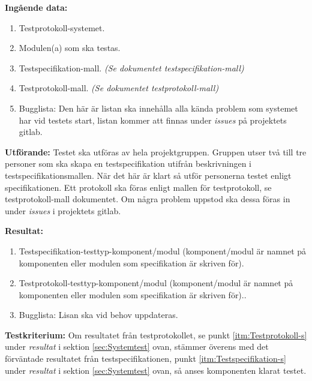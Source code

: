 \documentclass[a4paper,10pt]{article}
\begin{document}
\textbf{Ingående data:}
        \begin{enumerate}
            \item Testprotokoll-systemet.
            \item Modulen(a) som ska testas.
            \item Testspecifikation-mall. \emph{(Se dokumentet testspecifikation-mall)}
            \item Testprotokoll-mall. \emph{(Se dokumentet testprotokoll-mall)}
            \item Bugglista: Den här är listan ska innehålla alla kända problem som systemet har vid testets start, listan kommer att finnas under \emph{issues} på projektets gitlab.
        \end{enumerate}

\textbf{Utförande:} Testet ska utföras av hela projektgruppen. Gruppen utser två till tre personer som ska skapa en testspecifikation utifrån beskrivningen i testspecifikationsmallen. När det här är klart så utför personerna testet enligt specifikationen. Ett protokoll ska föras enligt mallen för testprotokoll, se testprotokoll-mall dokumentet. Om några problem uppstod ska dessa föras in under \emph{issues} i projektets gitlab.

\textbf{Resultat:}
    \begin{enumerate}
        \item \label{itm:Testspecifikation-a} Testspecifikation-testtyp-komponent/modul (komponent/modul är namnet på komponenten eller modulen som specifikation är skriven för).
        \item \label{itm:Testprotokoll-a} Testprotokoll-testtyp-komponent/modul (komponent/modul är namnet på komponenten eller modulen som specifikation är skriven för)..
        \item Bugglista: Lisan ska vid behov uppdateras.
    \end{enumerate}

\textbf{Testkriterium:} Om resultatet från testprotokollet, se punkt \ref{itm:Testprotokoll-s} under \emph{resultat} i sektion \ref{sec:Systemtest} ovan, stämmer överens med det förväntade resultatet från testspecifikationen, punkt \ref{itm:Testspecifikation-s} under \emph{resultat} i sektion \ref{sec:Systemtest} ovan, så anses komponenten klarat testet.
\end{document}

